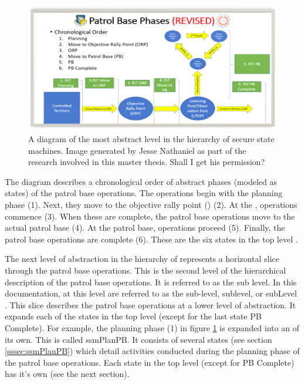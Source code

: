 \documentclass[../../main/main.tex]{subfiles}
\begin{document}
\begin{figure}[h]
\includegraphics[width=\textwidth]{../figures/pbtoplevel}
\caption{\label{pbtoplevel}A diagram of the most abstract level in the hierarchy of secure state machines.  Image generated by Jesse Nathaniel as part of the research involved in this master thesis.  Shall I get his permission?}
\end{figure}

The diagram describes a chronological order of abstract phases (modeled as states) of the patrol base operations.  The operations begin with the planning phase (1).  Next, they move to the objective rally point () (2). At the , operations commence (3).  When these are complete, the patrol base operations move to the actual patrol base (4).  At the patrol base, operations proceed (5).  Finally, the patrol base operations are complete (6).  These are the six states in the top level .


The next level of abstraction in the hierarchy of  represents a horizontal slice through the patrol base operations.  This is the second level of the hierarchical description of the patrol base operations. It is referred to as the sub level.  In this documentation,  at this level are referred to as the sub-level, sublevel, or subLevel . This slice describes the patrol base operations at a lower level of abstraction.  It expands each of the states in the top level (except for the last state PB Complete).  For example, the planning phase (1) in figure \ref{pbtoplevel} is expanded into an  of its own.  This is called ssmPlanPB.  It consists of several states (see section \ref{sssec:ssmPlanPB}) which detail activities conducted during the planning phase of the patrol base operations.  Each state in the top level (except for PB Complete) has it's own  (see the next section).
\end{document}
